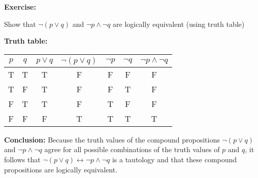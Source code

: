 \begin{tcolorbox}[title=Example 1: Show 2. De Morgan´s Law with truth table]
\textbf{Exercise:}  
\begin{center}
Show that $\neg (p\lor q) $ and $\neg p \land \neg q$  are logically equivalent (using truth table) 
\end{center}
\textbf{Truth table:}
\begin{center}
\begin{tabular}{|c|c!{\vrule width 1.5pt}c|c!{\vrule width 1.5pt}c|c|c|}
\hline
{}
$p$ & $q$ & $p \lor q$ & $\neg (p \lor q)$ & $\neg p$ & $\neg q$ & $\neg p \land \neg q$ \\
\hline
T & T & T & F & F & F & F \\
T & F & T & F & F & T & F \\
F & T & T & F & T & F & F \\
F & F & F & T & T & T & T \\
\hline
\end{tabular}    
\end{center}

\textbf{Conclusion:}  
Because the truth values of the compound propositions $\neg (p\lor q) $ and $\neg p \land \neg q$ agree for all possible combinations
of the truth values of $p$ and $q$, it follows that $\neg (p\lor q) \leftrightarrow \neg p \land \neg q$  is a tautology and
that these compound propositions are logically equivalent.
\end{tcolorbox}

